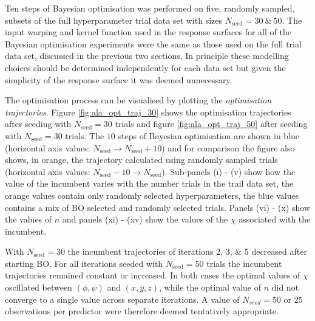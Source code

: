 Ten steps of Bayesian optimisation was performed on five, randomly sampled, subsets of the full hyperparameter trial data set with sizes $N_{\mathrm{seed}}=30\ \&\ 50$. The input warping  and kernel function used in the response surfaces for all of the Bayesian optimisation experiments were the same as those used on the full trial data set, discussed in the previous two sections.  In principle these modelling choices should be determined independently for each data set but given the simplicity of the response surface it was deemed unnecessary. 

The optimisation process can be visualised by plotting the \emph{optimisation trajectories}. Figure \ref{fig:ala_opt_traj_30} shows the optimisation trajectories after seeding with $N_{\mathrm{seed}}=30$ trials and figure \ref{fig:ala_opt_traj_50} after seeding with $N_{\mathrm{seed}}=30$ trials. The $10$ steps of Bayesian optimisation are shown in blue (horizontal axis values: $N_{\mathrm{seed}} \rightarrow N_{\mathrm{seed}}+10$) and for comparison the figure also shows, in orange, the trajectory calculated using randomly sampled trials  (horizontal axis values: $N_{\mathrm{seed}}-10 \rightarrow N_{\mathrm{seed}}$). Sub-panels (i) -  (v) show how the value of the incumbent varies with the number trials in the trail data set, the orange values contain only randomly selected hyperparameters, the blue values contains a mix of BO selected and randomly selected trials. Panels (vi) - (x) show the values of $n$ and panels (xi) - (xv) show the values of the $\chi$ associated with the incumbent. 

With $N_{\mathrm{seed}}=30$ the incumbent trajectories of iterations 2, 3, \& 5 decreased after starting BO. For all iterations seeded with $N_{\mathrm{seed}}=50$ trials the incumbent trajectories remained constant or increased. In both cases the optimal values of $\chi$ oscillated between $(\phi, \psi)$ and $(x, y, z)$, while the optimal value of $n$ did not converge to a single value across separate iterations. A value of  $N_{seed} = 50$ or $25$ observations per predictor were therefore deemed tentatively appropriate. 

